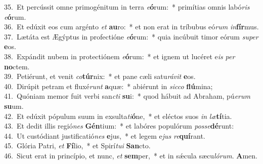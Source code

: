 {35.~}Et percússit omne primogénitum in terra \textit{e}\textbf{ó}rum:~* primítias omnis labó\textit{ris} \textit{e}\textbf{ó}rum.\\
{36.~}Et edúxit eos cum argénto \textit{et} \textbf{au}ro:~* et non erat in tríbubus eó\textit{rum} \textit{in}\textbf{fír}mus.\\
{37.~}Lætáta est Ægýptus in profectióne \textit{e}\textbf{ó}rum:~* quia incúbuit timor eórum \textit{su}\textit{per} \textbf{e}os.\\
{38.~}Expándit nubem in protectiónem \textit{e}\textbf{ó}rum:~* et ignem ut lucéret e\textit{is} \textit{per} \textbf{no}ctem.\\
{39.~}Petiérunt, et venit \textit{co}\textbf{túr}nix:~* et pane cæli satu\textit{rá}\textit{vit} \textbf{e}os.\\
{40.~}Dirúpit petram et fluxé\textit{runt} \textbf{a}quæ:~* abiérunt in \textit{sic}\textit{co} \textbf{flú}mina;\\
{41.~}Quóniam memor fuit verbi san\textit{cti} \textbf{su}i:~* quod hábuit ad Abraham, pú\textit{e}\textit{rum} \textbf{su}um.\\
{42.~}Et edúxit pópulum suum in exsulta\textit{ti}\textbf{ó}ne,~* et eléctos suos \textit{in} \textit{læ}\textbf{tí}tia.\\
{43.~}Et dedit illis regió\textit{nes} \textbf{Gén}tium:~* et labóres populórum \textit{pos}\textit{se}\textbf{dé}runt:\\
{44.~}Ut custódiant justificatió\textit{nes} \textbf{e}jus,~* et legem e\textit{jus} \textit{re}\textbf{quí}rant.\\
{45.~}Glória Patri, \textit{et} \textbf{Fí}lio,~* et Spirí\textit{tu}\textit{i} \textbf{San}cto.\\
{46.~}Sicut erat in princípio, et nunc, \textit{et} \textbf{sem}per,~* et in sǽcula sæcu\textit{ló}\textit{rum}. \textbf{A}men.\\
